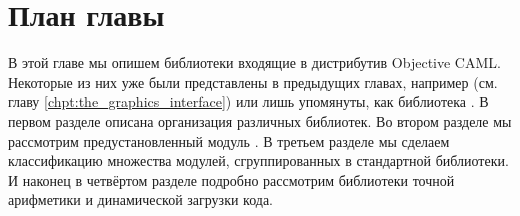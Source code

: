 \section {План главы}
\label{sec:chapter_outline_8}

В этой главе мы опишем библиотеки входящие в дистрибутив Objective CAML. 
Некоторые из них уже были представлены в предыдущих главах, например 
 (см. главу \ref{chpt:the_graphics_interface}) или лишь 
упомянуты, как библиотека . В первом разделе описана организация 
различных библиотек. Во втором разделе мы рассмотрим предустановленный модуль 
. В третьем разделе мы сделаем классификацию множества 
модулей, сгруппированных в стандартной библиотеки. И наконец в четвёртом 
разделе подробно рассмотрим библиотеки точной арифметики и динамической загрузки 
кода.
